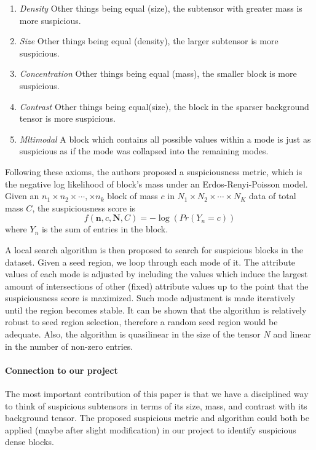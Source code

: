 \begin{enumerate}
\item {\it Density} Other things being equal (size), the subtensor with greater mass is more suspicious.

\item {\it Size} Other things being equal (density), the larger subtensor is more suspicious.

\item {\it Concentration} Other things being equal (mass), the smaller block is more suspicious.

\item {\it Contrast} Other things being equal(size), the block in the sparser background tensor is more suspicious.

\item {\it Mltimodal} A block which contains all possible values within a mode is just as suspicious as if the mode was collapsed into the remaining modes.

\end{enumerate}

Following these axioms, the authors proposed a suspiciousness metric, which is the negative log likelihood of block's mass under an Erdos-Renyi-Poisson model. Given an $n_1 \times n_2 \times \cdots, \times n_k$ block of mass $c$ in $N_1 \times N_2 \times \cdots \times N_K$ data of total mass $C$, the suspiciousness score is 
$$f(\mathbf{n}, c, \mathbf{N}, C) = -\log(Pr(Y_n = c))$$
where $Y_n$ is the sum of entries in the block.

A local search algorithm is then proposed to search for suspicious blocks in the dataset. Given a seed region, we loop through each mode of it. The attribute values of each mode is adjusted by including the values which induce the largest amount of intersections of other (fixed) attribute values up to the point that the suspiciousness score is maximized. Such mode adjustment is made iteratively until the region becomes stable. It can be shown that the algorithm is relatively robust to seed region selection, therefore a random seed region would be adequate. Also, the algorithm is quasilinear in the size of the tensor $N$ and linear in the number of non-zero entries.

\paragraph{Connection to our project} The most important contribution of this paper is that we have a disciplined way to think of suspicious subtensors in terms of its size, mass, and contrast with its background tensor. The proposed suspicious metric and algorithm could both be applied (maybe after slight modification) in our project to identify suspicious dense blocks.

